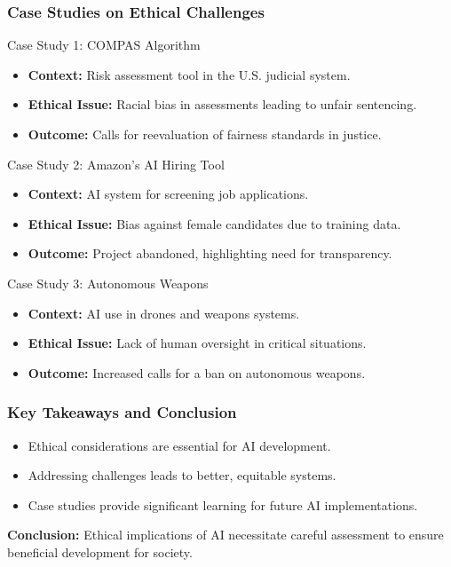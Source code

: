 \documentclass[aspectratio=169]{beamer}
\begin{document}
\begin{frame}[fragile]
    \frametitle{Case Studies on Ethical Challenges}
    \begin{block}{Case Study 1: COMPAS Algorithm}
        \begin{itemize}
            \item \textbf{Context:} Risk assessment tool in the U.S. judicial system.
            \item \textbf{Ethical Issue:} Racial bias in assessments leading to unfair sentencing.
            \item \textbf{Outcome:} Calls for reevaluation of fairness standards in justice.
        \end{itemize}
    \end{block}
    
    \begin{block}{Case Study 2: Amazon's AI Hiring Tool}
        \begin{itemize}
            \item \textbf{Context:} AI system for screening job applications.
            \item \textbf{Ethical Issue:} Bias against female candidates due to training data.
            \item \textbf{Outcome:} Project abandoned, highlighting need for transparency.
        \end{itemize}
    \end{block}

    \begin{block}{Case Study 3: Autonomous Weapons}
        \begin{itemize}
            \item \textbf{Context:} AI use in drones and weapons systems.
            \item \textbf{Ethical Issue:} Lack of human oversight in critical situations.
            \item \textbf{Outcome:} Increased calls for a ban on autonomous weapons.
        \end{itemize}
    \end{block}
\end{frame}

\begin{frame}[fragile]
    \frametitle{Key Takeaways and Conclusion}
    \begin{itemize}
        \item Ethical considerations are essential for AI development.
        \item Addressing challenges leads to better, equitable systems.
        \item Case studies provide significant learning for future AI implementations.
    \end{itemize}
    
    \textbf{Conclusion:} Ethical implications of AI necessitate careful assessment to ensure beneficial development for society.
\end{frame}
\end{document}
